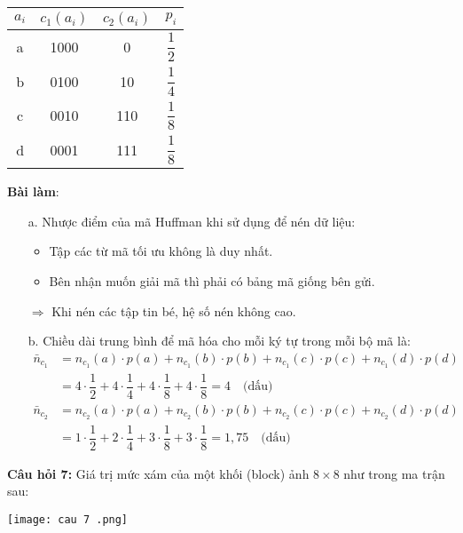 \documentclass[12pt]{article}
\begin{document}
\begin{center}
\renewcommand{\arraystretch}{1.5}
\setlength{\tabcolsep}{20pt}
\begin{tabular}{|c|c|c|c|}
\hline
\textbf{$a_i$} & \textbf{$c_1(a_i)$} & \textbf{$c_2(a_i)$} & \textbf{$p_i$} \\
\hline
a & 1000 & 0   & $\dfrac{1}{2}$ \\
b & 0100 & 10  & $\dfrac{1}{4}$ \\
c & 0010 & 110 & $\dfrac{1}{8}$ \\
d & 0001 & 111 & $\dfrac{1}{8}$ \\
\hline
\end{tabular}
\end{center}
\textbf{Bài làm}: 
\begin{itemize}
    \item[a.] Nhược điểm của mã Huffman khi sử dụng để nén dữ liệu:
    \begin{itemize}[label=.]
        \item Tập các từ mã tối ưu không là duy nhất.
        \item Bên nhận muốn giải mã thì phải có bảng mã giống bên gửi.
    \end{itemize}
    $\Rightarrow$ Khi nén các tập tin bé, hệ số nén không cao.
    
    \item[b.] Chiều dài trung bình để mã hóa cho mỗi ký tự trong mỗi bộ mã là:
    \begin{align*}
        \bar{n}_{c_1} &= n_{c_1}(a) \cdot p(a) + n_{c_1}(b) \cdot p(b) + n_{c_1}(c) \cdot p(c) + n_{c_1}(d) \cdot p(d) \\
        &= 4 \cdot \dfrac{1}{2} + 4 \cdot \dfrac{1}{4} + 4 \cdot \dfrac{1}{8} + 4 \cdot \dfrac{1}{8} = 4 \quad \text{(dấu)} \\
        \bar{n}_{c_2} &= n_{c_2}(a) \cdot p(a) + n_{c_2}(b) \cdot p(b) + n_{c_2}(c) \cdot p(c) + n_{c_2}(d) \cdot p(d) \\
        &= 1 \cdot \dfrac{1}{2} + 2 \cdot \dfrac{1}{4} + 3 \cdot \dfrac{1}{8} + 3 \cdot \dfrac{1}{8} = 1{,}75 \quad \text{(dấu)}
    \end{align*}
\end{itemize}

\newpage
\textbf{Câu hỏi 7:} Giá trị mức xám của một khối (block) ảnh $8 \times 8$ như trong ma trận sau:
\begin{center}
    \texttt{[image: cau 7 .png]}
\end{center}
\end{document}
